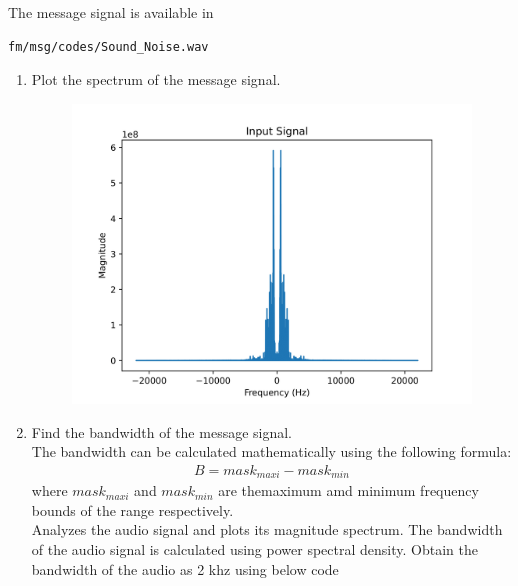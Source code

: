The message signal is available in 
\begin{lstlisting}
fm/msg/codes/Sound_Noise.wav
\end{lstlisting}
\begin{enumerate}[label=\arabic*.,ref=\thesection.\theenumi]
\item Plot the spectrum of the message signal.
\begin{figure}[h]
    \includegraphics[scale=0.7]{fm/msg/inputs-1.png}
\end{figure}

\item Find the bandwidth of the message signal.\\
\solution The bandwidth can be calculated mathematically using the following formula:
\begin{align*}
B=mask_{maxi}-mask_{min}
\end{align*}
where $mask_{maxi}$ and $mask_{min} $ are themaximum amd minimum frequency bounds of the range  respectively.\\
Analyzes the audio signal and plots its magnitude spectrum. The bandwidth of the audio signal is  calculated using power spectral density. Obtain the bandwidth of the audio as 2 khz using below code
\begin{center}
\end{center}
\end{enumerate}
